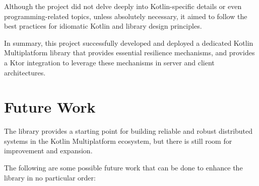Although the project did not delve deeply into Kotlin-specific details or even programming-related topics, unless
absolutely necessary, it aimed to follow the best practices for idiomatic Kotlin and library design principles.

In summary,
this project successfully developed and deployed a dedicated Kotlin Multiplatform library
that provides essential resilience mechanisms,
and provides a Ktor integration to leverage these mechanisms in server and client architectures.


\section{Future Work}\label{sec:future-work}

The library provides a starting point for building reliable and robust distributed systems in the Kotlin Multiplatform ecosystem, but there is still room for improvement and expansion.

The following are some possible future work that can be done to enhance the library in no particular order:

